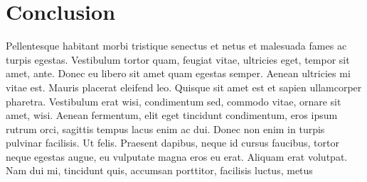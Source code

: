 
\chapter{Conclusion}\label{sec:conclusion}
Pellentesque habitant morbi tristique senectus et netus et malesuada fames ac turpis egestas. Vestibulum tortor quam, feugiat vitae, ultricies eget, tempor sit amet, ante. Donec eu libero sit amet quam egestas semper. Aenean ultricies mi vitae est. Mauris placerat eleifend leo. Quisque sit amet est et sapien ullamcorper pharetra. Vestibulum erat wisi, condimentum sed, commodo vitae, ornare sit amet, wisi. Aenean fermentum, elit eget tincidunt condimentum, eros ipsum rutrum orci, sagittis tempus lacus enim ac dui. Donec non enim in turpis pulvinar facilisis. Ut felis. Praesent dapibus, neque id cursus faucibus, tortor neque egestas augue, eu vulputate magna eros eu erat. Aliquam erat volutpat. Nam dui mi, tincidunt quis, accumsan porttitor, facilisis luctus, metus
